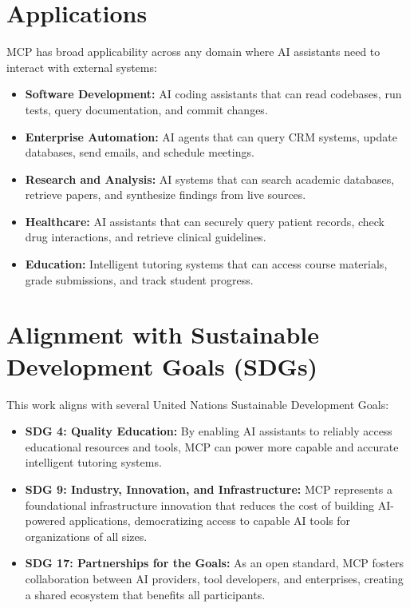 \section{Applications}
MCP has broad applicability across any domain where AI assistants need to interact with external systems:
\begin{itemize}
    \item \textbf{Software Development:} AI coding assistants that can read codebases, run tests, query documentation, and commit changes.
    \item \textbf{Enterprise Automation:} AI agents that can query CRM systems, update databases, send emails, and schedule meetings.
    \item \textbf{Research and Analysis:} AI systems that can search academic databases, retrieve papers, and synthesize findings from live sources.
    \item \textbf{Healthcare:} AI assistants that can securely query patient records, check drug interactions, and retrieve clinical guidelines.
    \item \textbf{Education:} Intelligent tutoring systems that can access course materials, grade submissions, and track student progress.
\end{itemize}

\section{Alignment with Sustainable Development Goals (SDGs)}
This work aligns with several United Nations Sustainable Development Goals:
\begin{itemize}
    \item \textbf{SDG 4: Quality Education:} By enabling AI assistants to reliably access educational resources and tools, MCP can power more capable and accurate intelligent tutoring systems.
    \item \textbf{SDG 9: Industry, Innovation, and Infrastructure:} MCP represents a foundational infrastructure innovation that reduces the cost of building AI-powered applications, democratizing access to capable AI tools for organizations of all sizes.
    \item \textbf{SDG 17: Partnerships for the Goals:} As an open standard, MCP fosters collaboration between AI providers, tool developers, and enterprises, creating a shared ecosystem that benefits all participants.
\end{itemize}

